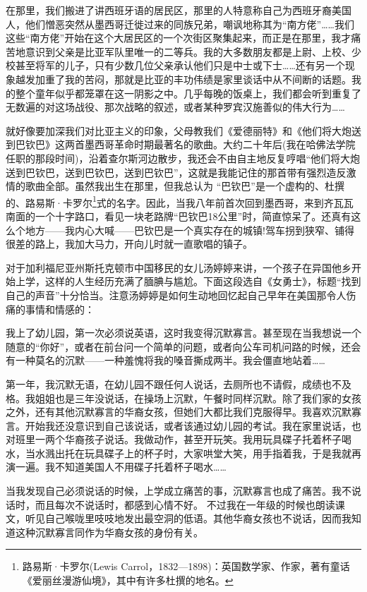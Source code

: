 在那里，我们搬进了讲西班牙语的居民区，那里的人特意称自己为西班牙裔美国人，他们憎恶突然从墨西哥迁徙过来的同族兄弟，嘲讽地称其为“南方佬”……我们这些“南方佬”开始在这个大居民区的一个次街区聚集起来，而正是在那里，我才痛苦地意识到父亲是比亚军队里唯一的二等兵。我的大多数朋友都是上尉、上校、少校甚至将军的儿子，只有少数几位父亲承认他们只是中士或下士……还有另一个现象越发加重了我的苦闷，那就是比亚的丰功伟绩是家里谈话中从不间断的话题。我的整个童年似乎都笼罩在这一阴影之中。几乎每晚的饭桌上，我们都会听到重复了无数遍的对这场战役、那次战略的叙述，或者某种罗宾汉施善似的伟大行为……

就好像要加深我们对比亚主义的印象，父母教我们《爱德丽特》和《他们将大炮送到巴钦巴》这两首墨西哥革命时期最著名的歌曲。大约二十年后(我在哈佛法学院任职的那段时间)，沿着查尔斯河边散步，我还会不由自主地反复哼唱“他们将大炮送到巴钦巴，送到巴钦巴，送到巴钦巴”，这就是我能记住的那首带有强烈造反激情的歌曲全部。虽然我出生在那里，但我总认为 “巴钦巴”是一个虚构的、杜撰的、路易斯·卡罗尔\footnote{路易斯·卡罗尔(Lewis Carrol，1832—1898)：英国数学家、作家，著有童话《爱丽丝漫游仙境》，其中有许多杜撰的地名。}式的名字。因此，当我八年前首次回到墨西哥，来到齐瓦瓦南面的一个十字路口，看见一块老路牌“巴钦巴18公里”时，简直惊呆了。还真有这 么个地方——我内心大喊——巴钦巴是一个真实存在的城镇!驾车拐到狭窄、铺得很差的路上，我加大马力，开向儿时就一直歌唱的镇子。

对于加利福尼亚州斯托克顿市中国移民的女儿汤婷婷来讲，一个孩子在异国他乡开始上学，这样的人生经历充满了腼腆与尴尬。下面这段选自《女勇士》，标题“找到自己的声音”十分恰当。注意汤婷婷是如何生动地回忆起自己早年在美国那令人伤痛的事情和情感的：

我上了幼儿园，第一次必须说英语，这时我变得沉默寡言。甚至现在当我想说一个随意的“你好”，或者在前台问一个简单的问题，或者向公车司机问路的时候，还会有一种莫名的沉默——一种羞愧将我的嗓音撕成两半。我会僵直地站着……

第一年，我沉默无语，在幼儿园不跟任何人说话，去厕所也不请假，成绩也不及格。我姐姐也是三年没说话，在操场上沉默，午餐时同样沉默。除了我们家的女孩之外，还有其他沉默寡言的华裔女孩，但她们大都比我们克服得早。我喜欢沉默寡言。开始我还没意识到自己该说话，或者该通过幼儿园的考试。我在家里说话，也对班里一两个华裔孩子说话。我做动作，甚至开玩笑。我用玩具碟子托着杯子喝水，当水溅出托在玩具碟子上的杯子时，大家哄堂大笑，用手指着我，于是我就再演一遍。我不知道美国人不用碟子托着杯子喝水……

当我发现自己必须说话的时候，上学成立痛苦的事，沉默寡言也成了痛苦。我不说话时，而且每次不说话时，都感到心情不好。 不过我在一年级的时候也朗读课文，听见自己喉咙里吱吱地发出最空洞的低语。其他华裔女孩也不说话，因而我知道这种沉默寡言同作为华裔女孩的身份有关。


